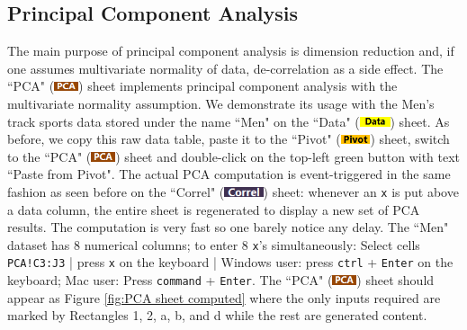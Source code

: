 \documentclass[article]{jss}
\numberwithin{equation}{subsection}
\newcommand{\shtData}{``Data" (\includegraphics[height=8pt, keepaspectratio=true]{DataSheetTab_png}) }
\newcommand{\shtPivot}{``Pivot" (\includegraphics[height=8pt, keepaspectratio=true]{PivotSheetTab_png}) }
\newcommand{\shtCorrel}{``Correl" (\includegraphics[height=8pt, keepaspectratio=true]{CorrelSheetTab_png}) }
\newcommand{\shtPCA}{``PCA" (\includegraphics[height=8pt, keepaspectratio=true]{PcaSheetTab_png}) }
\begin{document}
        \subsection[egPCA]{Principal Component Analysis}
        The main purpose of principal component analysis is dimension reduction and, if one assumes multivariate normality of data, de-correlation as a side effect. The \shtPCA sheet implements principal component analysis with the multivariate normality assumption.        
        We demonstrate its usage with the Men's track sports data stored under the name ``Men" on the \shtData sheet. As before, we copy this raw data table, paste it to the \shtPivot sheet, switch to the \shtPCA sheet and double-click on the top-left green button with text ``Paste from Pivot". The actual PCA computation is event-triggered in the same fashion as seen before on the \shtCorrel sheet: whenever an \texttt{x} is put above a data column, the entire sheet is regenerated to display a new set of PCA results. The computation is very fast so one barely notice any delay. The ``Men" dataset has 8 numerical columns; to enter 8 \texttt{x}'s simultaneously: Select cells \texttt{PCA!C3:J3} | press \texttt{x} on the keyboard | Windows user: press \texttt{ctrl} + \texttt{Enter} on the keyboard; Mac user: Press \texttt{command} + \texttt{Enter}. The \shtPCA sheet should appear as Figure \ref{fig:PCA sheet computed} where the only inputs required are marked by Rectangles 1, 2, a, b, and d while the rest are generated content.
\end{document}
